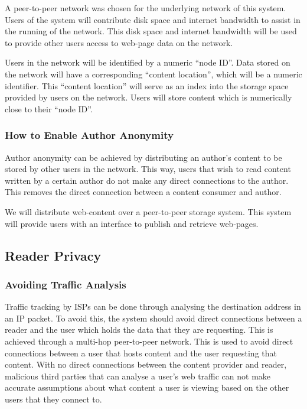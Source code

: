 A peer-to-peer network was chosen for the underlying network of this system. Users of the system will
contribute disk space and internet bandwidth to assist in the running of the network. This disk space and
internet bandwidth will be used to provide other users access to web-page data on the network.

Users in the network will be identified by a numeric ``node ID''. Data stored on the network will have a
corresponding ``content location'', which will be a numeric identifier. This ``content location'' will
serve as an index into the storage space provided by users on the network. Users will store content which
is numerically close to their ``node ID''.

\subsubsection{How to Enable Author Anonymity}

Author anonymity can be achieved by distributing an author's content to be stored by other users in the network.
This way, users that wish to read content written by a certain author do not make any direct connections to
the author. This removes the direct connection between a content consumer and author.

We will distribute web-content over a peer-to-peer storage system. This system will provide users with an
interface to publish and retrieve web-pages.


\subsection{Reader Privacy}

\subsubsection{Avoiding Traffic Analysis}

Traffic tracking by ISPs can be done through analysing the destination address in an IP packet. To avoid this,
the system should avoid direct connections between a reader and the user which holds the data that they are
requesting. This is achieved through a multi-hop peer-to-peer network. This is used to avoid direct connections
between a user that hosts content and the user requesting that content. With no direct connections between
the content provider and reader, malicious third parties that can analyse a user's web traffic can not make
accurate assumptions about what content a user is viewing based on the other users that they connect to.

